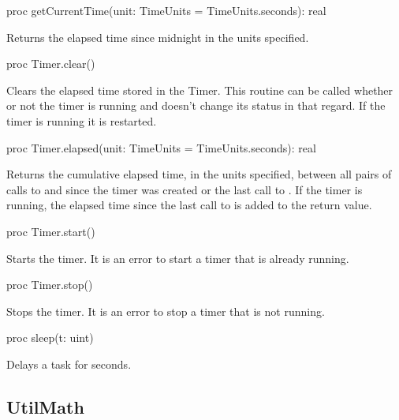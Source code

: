 \begin{protohead}
proc getCurrentTime(unit: TimeUnits = TimeUnits.seconds): real
\end{protohead}
\begin{protobody}
Returns the elapsed time since midnight in the units specified.
\end{protobody}

\begin{protohead}
proc Timer.clear()
\end{protohead}
\begin{protobody}
Clears the elapsed time stored in the Timer.  This routine can be called
whether or not the timer is running and doesn't change its status in that
regard.  If the timer is running it is restarted.
\end{protobody}

\begin{protohead}
proc Timer.elapsed(unit: TimeUnits = TimeUnits.seconds): real
\end{protohead}
\begin{protobody}
Returns the cumulative elapsed time, in the units specified, between
all pairs of calls to  and  since the timer was
created or the last call to .  If the timer is running,
the elapsed time since the last call to  is added to the
return value.
\end{protobody}

\begin{protohead}
proc Timer.start()
\end{protohead}
\begin{protobody}
Starts the timer.  It is an error to start a timer that is already
running.
\end{protobody}

\begin{protohead}
proc Timer.stop()
\end{protohead}
\begin{protobody}
Stops the timer.  It is an error to stop a timer that is not running.
\end{protobody}

\begin{protohead}
proc sleep(t: uint)
\end{protohead}
\begin{protobody}
Delays a task for  seconds.
\end{protobody}


\subsection{UtilMath}
\label{StdModules_UtilMath}

